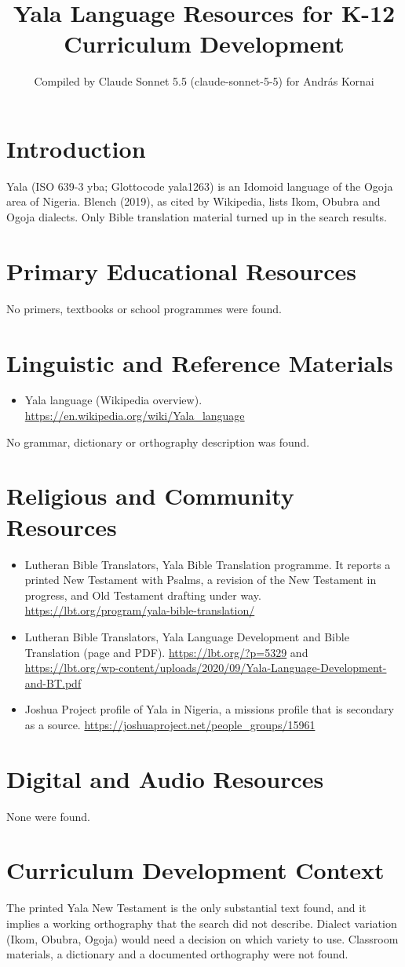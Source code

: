 \documentclass[12pt]{article}
\title{Yala Language Resources for K-12 Curriculum Development}
\author{Compiled by Claude Sonnet 5.5 (claude-sonnet-5-5) for Andr\'as Kornai}
\date{}
\begin{document}
\maketitle

\section{Introduction}
Yala (ISO 639-3 yba; Glottocode yala1263) is an Idomoid language of the Ogoja area of Nigeria. Blench (2019), as cited by Wikipedia, lists Ikom, Obubra and Ogoja dialects. Only Bible translation material turned up in the search results.

\section{Primary Educational Resources}
No primers, textbooks or school programmes were found.

\section{Linguistic and Reference Materials}
\begin{itemize}
\item Yala language (Wikipedia overview). \url{https://en.wikipedia.org/wiki/Yala_language}
\end{itemize}
No grammar, dictionary or orthography description was found.

\section{Religious and Community Resources}
\begin{itemize}
\item Lutheran Bible Translators, Yala Bible Translation programme. It reports a printed New Testament with Psalms, a revision of the New Testament in progress, and Old Testament drafting under way. \url{https://lbt.org/program/yala-bible-translation/}
\item Lutheran Bible Translators, Yala Language Development and Bible Translation (page and PDF). \url{https://lbt.org/?p=5329} and \url{https://lbt.org/wp-content/uploads/2020/09/Yala-Language-Development-and-BT.pdf}
\item Joshua Project profile of Yala in Nigeria, a missions profile that is secondary as a source. \url{https://joshuaproject.net/people_groups/15961}
\end{itemize}

\section{Digital and Audio Resources}
None were found.

\section{Curriculum Development Context}
The printed Yala New Testament is the only substantial text found, and it implies a working orthography that the search did not describe. Dialect variation (Ikom, Obubra, Ogoja) would need a decision on which variety to use. Classroom materials, a dictionary and a documented orthography were not found.
\end{document}

